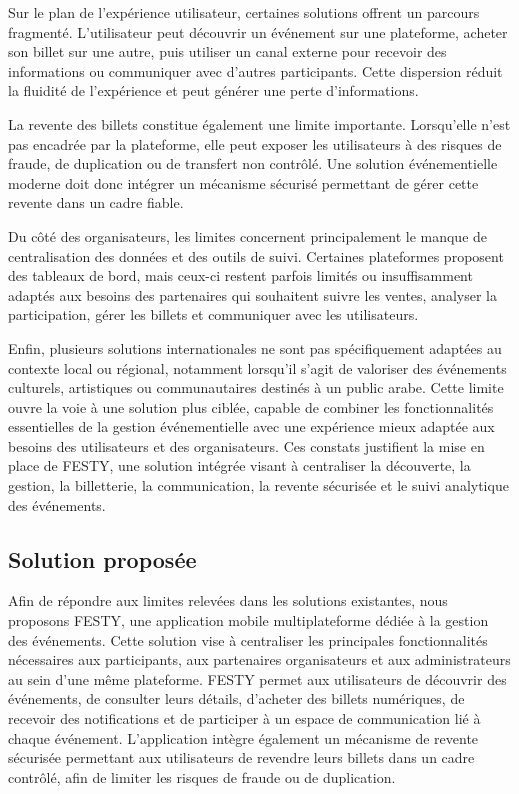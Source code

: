 Sur le plan de l'expérience utilisateur, certaines solutions offrent un parcours fragmenté. L'utilisateur peut découvrir un événement sur une plateforme, acheter son billet sur une autre, puis utiliser un canal externe pour recevoir des informations ou communiquer avec d'autres participants. Cette dispersion réduit la fluidité de l'expérience et peut générer une perte d'informations.

La revente des billets constitue également une limite importante. Lorsqu'elle n'est pas encadrée par la plateforme, elle peut exposer les utilisateurs à des risques de fraude, de duplication ou de transfert non contrôlé. Une solution événementielle moderne doit donc intégrer un mécanisme sécurisé permettant de gérer cette revente dans un cadre fiable.

Du côté des organisateurs, les limites concernent principalement le manque de centralisation des données et des outils de suivi. Certaines plateformes proposent des tableaux de bord, mais ceux-ci restent parfois limités ou insuffisamment adaptés aux besoins des partenaires qui souhaitent suivre les ventes, analyser la participation, gérer les billets et communiquer avec les utilisateurs.

Enfin, plusieurs solutions internationales ne sont pas spécifiquement adaptées au contexte local ou régional, notamment lorsqu'il s'agit de valoriser des événements culturels, artistiques ou communautaires destinés à un public arabe. Cette limite ouvre la voie à une solution plus ciblée, capable de combiner les fonctionnalités essentielles de la gestion événementielle avec une expérience mieux adaptée aux besoins des utilisateurs et des organisateurs.
Ces constats justifient la mise en place de FESTY, une solution intégrée visant à centraliser la découverte, la gestion, la billetterie, la communication, la revente sécurisée et le suivi analytique des événements.

\subsection{Solution proposée}
Afin de répondre aux limites relevées dans les solutions existantes, nous proposons FESTY, une application mobile multiplateforme dédiée à la gestion des événements. Cette solution vise à centraliser les principales fonctionnalités nécessaires aux participants, aux partenaires organisateurs et aux administrateurs au sein d’une même plateforme.
FESTY permet aux utilisateurs de découvrir des événements, de consulter leurs détails, d'acheter des billets numériques, de recevoir des notifications et de participer à un espace de communication lié à chaque événement. L'application intègre également un mécanisme de revente sécurisée permettant aux utilisateurs de revendre leurs billets dans un cadre contrôlé, afin de limiter les risques de fraude ou de duplication.

